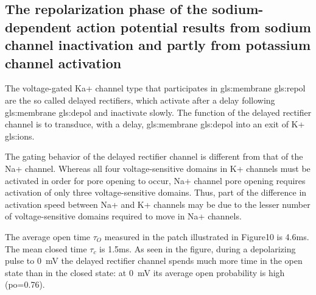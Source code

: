 \documentclass[class={myRUCProject}, crop=false]{standalone}
\begin{document}
\subsection{The repolarization phase of the sodium-dependent action potential results from sodium channel inactivation and partly from potassium channel activation}

The voltage-gated Ka+ channel type that participates in \gls{gls:membrane} \gls{gls:repol} are the so called delayed rectifiers, which activate after a delay following \gls{gls:membrane} \gls{gls:depol} and inactivate slowly. The function of the delayed rectifier channel is to transduce, with a delay, \gls{gls:membrane} \gls{gls:depol} into an exit of K+ \glspl{gls:ion}. 

The gating behavior of the delayed rectifier channel is different from that of the Na+ channel.  Whereas all four voltage-sensitive domains in K+ channels must be activated in order for pore opening to occur, Na+ channel pore opening requires activation of only three voltage-sensitive domains. Thus, part of the difference in activation speed between Na+ and K+ channels may be due to the lesser number of voltage-sensitive domains required to move in Na+ channels.

The average open time \(\tau_O\) measured in the patch illustrated in Figure10 is 4.6ms. The mean closed time \(\tau_c\) is 1.5ms. As seen in the figure, during a depolarizing pulse to \qty{0}{\mV} the delayed rectifier channel spends much more time in the open state than in the closed state: at \qty{0}{\mV} its average open probability is high (po=0.76).
\end{document}
